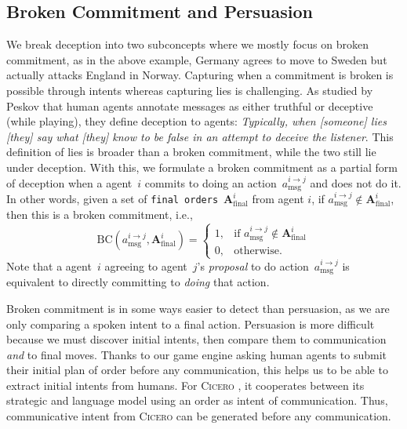\documentclass[oneside]{memoir}
\newcommand{\cicero}{\abr{Cicero} }
\newcommand{\abr}[1]{\textsc{#1}}
\begin{document}
\subsection{Broken Commitment and Persuasion}
We break deception into two subconcepts where we mostly focus on broken commitment, as in the above example, Germany agrees to move to Sweden but actually attacks England in Norway. Capturing when a commitment is broken is possible through intents whereas capturing lies is challenging. As studied by Peskov that human agents annotate messages as either truthful or deceptive (while playing), they define deception to agents: \textit{Typically, when [someone] lies [they] say what [they] know to be false in an attempt to deceive the listener}. This definition of lies is broader than a broken commitment, while the two still lie under deception. With this, we formulate a broken commitment as a partial form of deception when a agent~$i$ commits to doing an
action~$a^{i\to j}_{\text{msg}}$ and does not do it. In other words, given a set of \texttt{final orders}~$\mathbf{A}^{i}_{\text{final}}$ from agent $i$, 
if $a^{i\to j}_{\text{msg}} \notin \mathbf{A}^{i}_{\text{final}}$, then this is a broken commitment, i.e., 
\begin{equation}
    \text{BC}(a^{i\to j}_{\text{msg}},\mathbf{A}^{i}_{\text{final}}) = 
    \begin{cases}
        1,      & \text{if } a^{i\to j}_{\text{msg}} \notin \mathbf{A}^{i}_{\text{final}}\\
        0,      & \text{otherwise.}
    \end{cases}
    \label{eq:bc}
\end{equation}
Note that a agent~$i$ agreeing to 
agent~$j$'s \textit{proposal} to do
action~$a^{i\to j}_{\text{msg}}$ is equivalent to directly committing to \textit{doing} that
action.

Broken commitment is in some ways easier to detect than persuasion, as we are
only comparing a spoken intent to a final action. Persuasion is more difficult because we must discover initial
intents, then compare them to communication \emph{and} to final moves. Thanks to our game engine asking human agents to submit their initial plan of order before any communication, this helps us to be able to extract initial intents from humans. For \cicero, it cooperates between its strategic and language model using an order as intent of communication. Thus, communicative intent from \cicero can be generated before any communication. 
\end{document}
